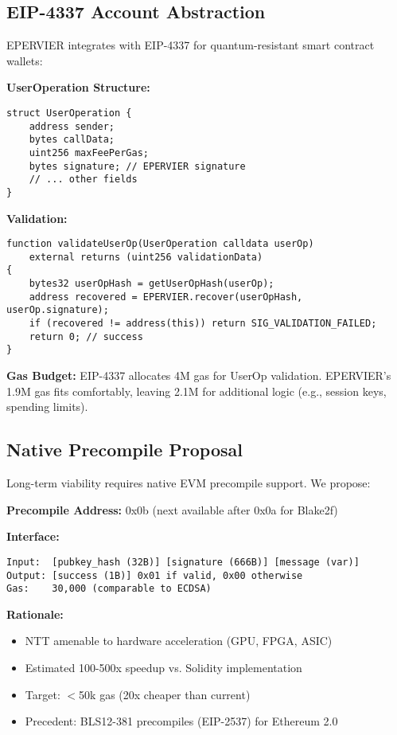 \documentclass[11pt,a4paper]{article}
\begin{document}
\subsection{EIP-4337 Account Abstraction}

EPERVIER integrates with EIP-4337 for quantum-resistant smart contract wallets:

\textbf{UserOperation Structure:}
\begin{lstlisting}
struct UserOperation {
    address sender;
    bytes callData;
    uint256 maxFeePerGas;
    bytes signature; // EPERVIER signature
    // ... other fields
}
\end{lstlisting}

\textbf{Validation:}
\begin{lstlisting}[language=Solidity]
function validateUserOp(UserOperation calldata userOp)
    external returns (uint256 validationData)
{
    bytes32 userOpHash = getUserOpHash(userOp);
    address recovered = EPERVIER.recover(userOpHash, userOp.signature);
    if (recovered != address(this)) return SIG_VALIDATION_FAILED;
    return 0; // success
}
\end{lstlisting}

\textbf{Gas Budget:} EIP-4337 allocates 4M gas for UserOp validation. EPERVIER's 1.9M gas fits comfortably, leaving 2.1M for additional logic (e.g., session keys, spending limits).

\subsection{Native Precompile Proposal}

Long-term viability requires native EVM precompile support. We propose:

\textbf{Precompile Address:} 0x0b (next available after 0x0a for Blake2f)

\textbf{Interface:}
\begin{lstlisting}
Input:  [pubkey_hash (32B)] [signature (666B)] [message (var)]
Output: [success (1B)] 0x01 if valid, 0x00 otherwise
Gas:    30,000 (comparable to ECDSA)
\end{lstlisting}

\textbf{Rationale:}
\begin{itemize}
    \item NTT amenable to hardware acceleration (GPU, FPGA, ASIC)
    \item Estimated 100-500x speedup vs. Solidity implementation
    \item Target: $<$50k gas (20x cheaper than current)
    \item Precedent: BLS12-381 precompiles (EIP-2537) for Ethereum 2.0
\end{itemize}
\end{document}
